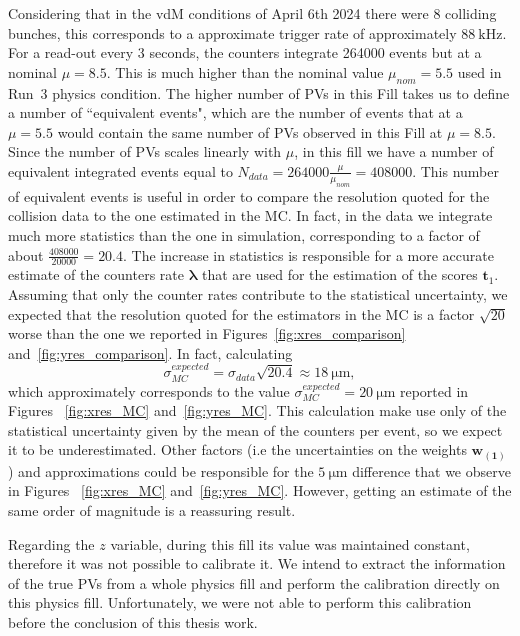 Considering that in the vdM conditions of April 6th 2024 there were 8 colliding bunches, this corresponds to a approximate trigger rate of approximately $\SI{88}{\kilo\hertz}$. For a read-out every 3 seconds, the counters integrate 264000 events but at a nominal $\mu=8.5$. This is much higher than the nominal value  $\mu_{nom}=5.5$ used  in Run~3 physics condition. The higher number of PVs in this Fill takes us to define a number of ``equivalent events", which are the number of events that at a $\mu=5.5$ would contain the same number of PVs observed in this Fill at $\mu=8.5$. Since the number of PVs scales linearly with $\mu$, in this fill we have a number of equivalent integrated events equal to $N_{data}=264000\tfrac{\mu}{\mu_{nom}}=408000$. This number of equivalent events is useful in order to compare the resolution quoted for the collision data to the one estimated in the MC. In fact, in the data we integrate much more statistics than the one in simulation, corresponding to a factor of about $\tfrac{408000}{20000}=20.4$.  The increase in statistics is responsible for a more accurate estimate of the counters rate $\mathbf{\lambda}$ that are used for the estimation of the scores $\mathbf{t}_{1}$. Assuming that only the counter rates contribute to the statistical uncertainty, we expected that the resolution quoted for the estimators in the MC is a factor $\sqrt{20}$ worse than the one we reported in Figures~\ref{fig:xres_comparison} and~\ref{fig:yres_comparison}. In fact, calculating
\begin{equation}
    \sigma_{MC}^{expected} = \sigma_{data}\sqrt{20.4} \approx \SI{18}{\micro\meter},
\end{equation}
which approximately corresponds to the value $\sigma_{MC}^{expected}=\SI{20}{\micro\meter}$ reported in Figures ~\ref{fig:xres_MC} and~\ref{fig:yres_MC}. This calculation make use only of the statistical uncertainty given by the mean of the counters per event, so we expect it to be underestimated. Other factors (i.e the uncertainties on the weights $\mathbf{w_{(1)}}$) and approximations could be responsible for the $\SI{5}{\micro\meter}$ difference that we observe in Figures ~\ref{fig:xres_MC} and~\ref{fig:yres_MC}. However, getting an estimate of the same order of magnitude is a reassuring result.

Regarding the $z$ variable, during this fill its value was maintained constant, therefore it was not possible to calibrate it. We intend to extract the information of the true PVs from a whole physics fill and perform the calibration directly on this physics fill. Unfortunately, we were not able to perform this calibration before the conclusion of this thesis work. 


